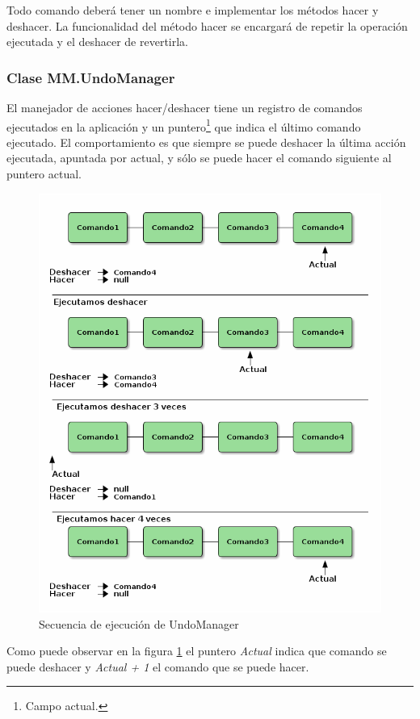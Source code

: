 Todo comando deberá tener un nombre e implementar los métodos hacer y deshacer. La funcionalidad del 
método hacer se encargará de repetir la operación ejecutada y el deshacer de revertirla.

\subsubsection{Clase MM.UndoManager}

El manejador de acciones hacer/deshacer tiene un registro de comandos ejecutados en la aplicación y un puntero\footnote{Campo actual.} que indica el último comando ejecutado. El comportamiento es que siempre se puede deshacer la última acción ejecutada, apuntada por actual, y sólo se puede hacer el comando siguiente al puntero actual.

\begin{figure}[tbph]
\centering
\includegraphics[width=0.7\linewidth]{imagenes/undomangerEjecucion.png}
\caption{Secuencia de ejecución de UndoManager}
\label{fig:undomanager-ejecucion}
\end{figure}
 
Como puede observar en la figura \ref{fig:undomanager-ejecucion} el puntero \textit{Actual} indica que comando se puede deshacer y \textit{Actual + 1} el comando que se puede hacer. 

